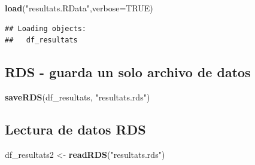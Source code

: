 \documentclass[
]{article}
\newenvironment{Shaded}{\begin{snugshade}}{\end{snugshade}}
\newcommand{\AttributeTok}[1]{\textcolor[rgb]{0.13,0.29,0.53}{#1}}
\newcommand{\ConstantTok}[1]{\textcolor[rgb]{0.56,0.35,0.01}{#1}}
\newcommand{\FunctionTok}[1]{\textcolor[rgb]{0.13,0.29,0.53}{\textbf{#1}}}
\newcommand{\NormalTok}[1]{#1}
\newcommand{\OtherTok}[1]{\textcolor[rgb]{0.56,0.35,0.01}{#1}}
\newcommand{\StringTok}[1]{\textcolor[rgb]{0.31,0.60,0.02}{#1}}
\begin{document}
\begin{Shaded}
\begin{Highlighting}[]
\FunctionTok{load}\NormalTok{(}\StringTok{"resultats.RData"}\NormalTok{,}\AttributeTok{verbose=}\ConstantTok{TRUE}\NormalTok{)}
\end{Highlighting}
\end{Shaded}

\begin{verbatim}
## Loading objects:
##   df_resultats
\end{verbatim}

\hypertarget{rds---guarda-un-solo-archivo-de-datos}{%
\subsection{RDS - guarda un solo archivo de
datos}\label{rds---guarda-un-solo-archivo-de-datos}}

\begin{Shaded}
\begin{Highlighting}[]
\FunctionTok{saveRDS}\NormalTok{(df\_resultats, }\StringTok{"resultats.rds"}\NormalTok{)}
\end{Highlighting}
\end{Shaded}

\hypertarget{lectura-de-datos-rds}{%
\subsection{Lectura de datos RDS}\label{lectura-de-datos-rds}}

\begin{Shaded}
\begin{Highlighting}[]
\NormalTok{df\_resultats2 }\OtherTok{\textless{}{-}} \FunctionTok{readRDS}\NormalTok{(}\StringTok{"resultats.rds"}\NormalTok{)}
\end{Highlighting}
\end{Shaded}
\end{document}

